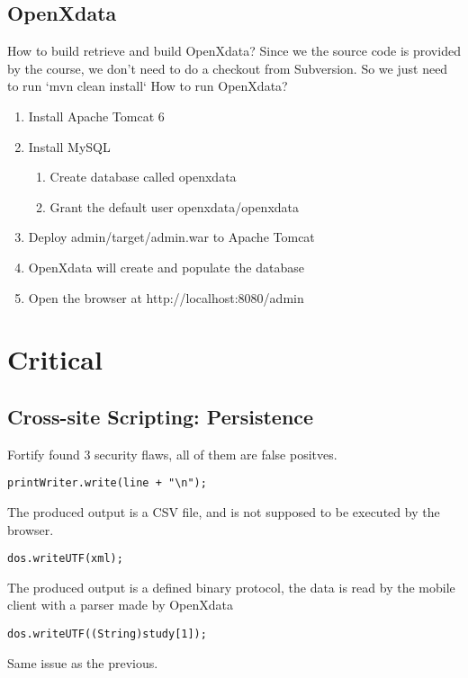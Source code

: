 \documentclass[11pt,a4paper]{article}
\theoremstyle{definition}
\begin{document}
\subsection{OpenXdata}
How to build retrieve and build OpenXdata?
Since we the source code is provided by the course, we don’t need to do a checkout from Subversion. So we just need to run `mvn clean install`
How to run OpenXdata?
\begin{enumerate}
 \item Install Apache Tomcat 6 
 \item Install MySQL
 \begin{enumerate}
  \item Create database called openxdata
  \item Grant the default user openxdata/openxdata
 \end{enumerate}
 \item Deploy admin/target/admin.war to Apache Tomcat
 \item OpenXdata will create and populate the database
 \item Open the browser at http://localhost:8080/admin
\end{enumerate}

\section{Critical}

\subsection{Cross-site Scripting: Persistence}
Fortify found 3 security flaws, all of them are false positves.

\begin{lstlisting}[caption=CSVDataExport.java:117]
printWriter.write(line + "\n");
\end{lstlisting}
The produced output is a CSV file, and is not supposed to be executed by the browser.


\begin{lstlisting}[caption=DefaultXformSerializer.java:64]
dos.writeUTF(xml);
\end{lstlisting}
The produced output is a defined binary protocol, the data is read by the mobile client with a parser made by OpenXdata


\begin{lstlisting}[caption=DefaultXformSerializer.java:82]
dos.writeUTF((String)study[1]);
\end{lstlisting}
Same issue as the previous.
\end{document}
